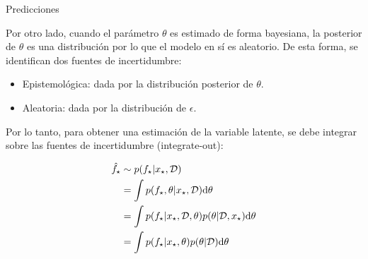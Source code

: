 \documentclass[9pt]{beamer}
\begin{document}
\begin{frame}{Predicciones}

Por otro lado, cuando el parámetro $\theta$ es estimado de forma bayesiana, la posterior de $\theta$ es una distribución por lo que el modelo en sí es aleatorio. \pause De esta forma, se identifican dos fuentes de incertidumbre:

\begin{itemize}
	\item Epistemológica: dada por la distribución posterior de $\theta$.\pause
	\item Aleatoria: dada por la distribución de $\epsilon$.\pause
\end{itemize}

Por lo tanto, para obtener una estimación de la variable latente, se debe integrar sobre las fuentes de incertidumbre (integrate-out):

\begin{align*}
	\hat f_\star &\sim p(f_\star|x_\star,{\mathcal D}) \\
	&= \int p(f_\star, \theta|x_\star,{\mathcal D}){\text d}\theta \\
	&= \int p(f_\star|x_\star, {\mathcal D}, \theta)p( \theta|{\mathcal D},x_\star){\text d}\theta \\
	&= \int p(f_\star|x_\star, \theta)p( \theta|{\mathcal D}){\text d}\theta
\end{align*}
	
\end{frame}
\end{document}
